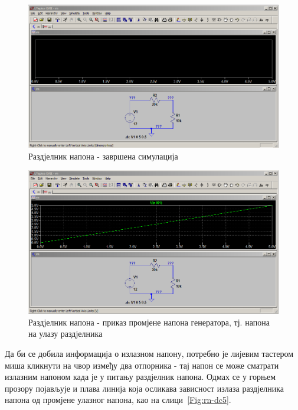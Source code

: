 \begin{figure}[h]
\centering
\includegraphics[width=\figwidth\textwidth]{figs/rn-dc3.PNG}
\caption{Раздјелник напона - завршена симулација}
\label{Fig:rn-dc3}
\end{figure}

\begin{figure}[h]
\centering
\includegraphics[width=\figwidth\textwidth]{figs/rn-dc4.PNG}
\caption{Раздјелник напона - приказ промјене напона генератора, тј. напона на улазу раздјелника}
\label{Fig:rn-dc4}
\end{figure}

Да би се добила информација о излазном напону, потребно је лијевим тастером миша кликнути на чвор између два отпорника - тај напон се може сматрати излазним напоном када је у питању раздјелник напона. Одмах се у горњем прозору појављује и плава линија која осликава зависност излаза раздјелника напона од промјене улазног напона, као на слици~\ref{Fig:rn-dc5}.

